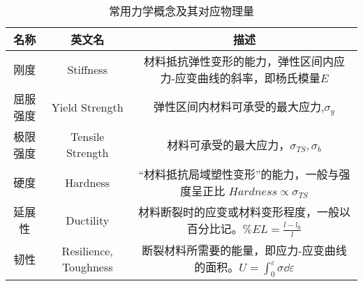 
\begin{table}[ht]
\centering
\caption{常用力学概念及其对应物理量}\label{SSCUR_tab1}
\begin{tabular}{|c|c|c|}
\hline
名称 & 英文名 & 描述\\
\hline
刚度 & Stiffness & 材料抵抗弹性变形的能力，弹性区间内应力-应变曲线的斜率，即杨氏模量$E$\\
\hline
屈服强度 & Yield Strength & 弹性区间内材料可承受的最大应力,$\sigma_y$\\
\hline
极限强度 & Tensile Strength & 材料可承受的最大应力，$\sigma_{TS}, \sigma_b$\\
\hline
硬度 & Hardness & “材料抵抗局域塑性变形”的能力，一般与强度呈正比 $Hardness \propto \sigma_{TS}$\\
\hline
延展性 & Ductility & 材料断裂时的应变或材料变形程度，一般以百分比记。$\%EL = \frac{l-l_0}{l} $\\
\hline
韧性 & Resilience, Toughness & 断裂材料所需要的能量，即应力-应变曲线的面积。$U = \int_0^\varepsilon \sigma \dd \varepsilon$\\
\hline
\end{tabular}
\end{table}
